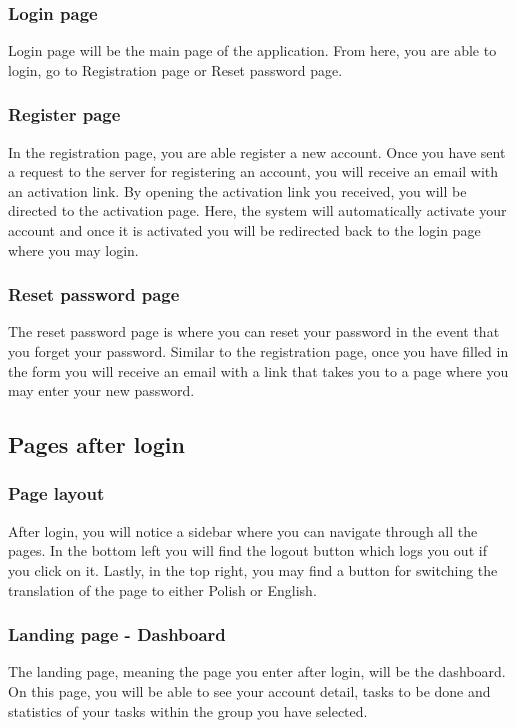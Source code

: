 \documentclass[singlespacing,12pt,parskip,headsepline,consistentlayout]{article}
\begin{document}
\subsubsection{Login page}
Login page will be the main page of the application. From here, you are able to login, go to Registration page or Reset password page.

\subsubsection{Register page}
In the registration page, you are able register a new account. Once you have sent a request to the server for registering an account, you will receive an email with an activation link. By opening the activation link you received, you will be directed to the activation page. Here, the system will automatically activate your account and once it is activated you will be redirected back to the login page where you may login.

\subsubsection{Reset password page}
The reset password page is where you can reset your password in the event that you forget your password. Similar to the registration page, once you have filled in the form you will receive an email with a link that takes you to a page where you may enter your new password.

\pagebreak

\subsection{Pages after login}

\subsubsection{Page layout}
After login, you will notice a sidebar where you can navigate through all the pages. In the bottom left you will find the logout button which logs you out if you click on it. Lastly, in the top right, you may find a button for switching the translation of the page to either Polish or English.

\subsubsection{Landing page - Dashboard}
The landing page, meaning the page you enter after login, will be the dashboard. On this page, you will be able to see your account detail, tasks to be done and statistics of your tasks within the group you have selected.
\end{document}
